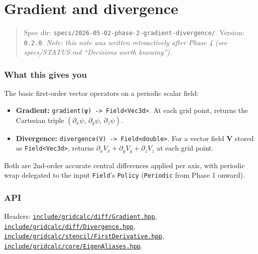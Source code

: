 \chapter{Gradient and divergence}
\label{chap:gradient-and-divergence}

\begin{quote}
Spec dir:
\passthrough{\lstinline!specs/2026-05-02-phase-2-gradient-divergence/!}.
Version: \passthrough{\lstinline!0.2.0!}. \emph{Note: this note was
written retroactively after Phase 4 (see specs/STATUS.md ``Decisions
worth knowing'').}
\end{quote}

\subsection{What this gives you}\label{what-this-gives-you}

The basic first-order vector operators on a periodic scalar field:

\begin{itemize}
\tightlist
\item
  \textbf{Gradient:}
  \passthrough{\lstinline!gradient(ψ) -> Field<Vec3d>!}. At each grid
  point, returns the Cartesian triple
  \((\partial_x \psi,\, \partial_y \psi,\, \partial_z \psi)\).
\item
  \textbf{Divergence:}
  \passthrough{\lstinline!divergence(V) -> Field<double>!}. For a vector
  field \(\mathbf{V}\) stored as \passthrough{\lstinline!Field<Vec3d>!},
  returns \(\partial_x V_x + \partial_y V_y + \partial_z V_z\) at each
  grid point.
\end{itemize}

Both are 2nd-order accurate central differences applied per axis, with
periodic wrap delegated to the input \passthrough{\lstinline!Field!}'s
\passthrough{\lstinline!Policy!} (\passthrough{\lstinline!Periodic!}
from Phase 1 onward).

\subsection{API}\label{api}

Headers:
\href{../../../include/gridcalc/diff/Gradient.hpp}{\passthrough{\lstinline!include/gridcalc/diff/Gradient.hpp!}},
\href{../../../include/gridcalc/diff/Divergence.hpp}{\passthrough{\lstinline!include/gridcalc/diff/Divergence.hpp!}},
\href{../../../include/gridcalc/stencil/FirstDerivative.hpp}{\passthrough{\lstinline!include/gridcalc/stencil/FirstDerivative.hpp!}},
\href{../../../include/gridcalc/core/EigenAliases.hpp}{\passthrough{\lstinline!include/gridcalc/core/EigenAliases.hpp!}}.

